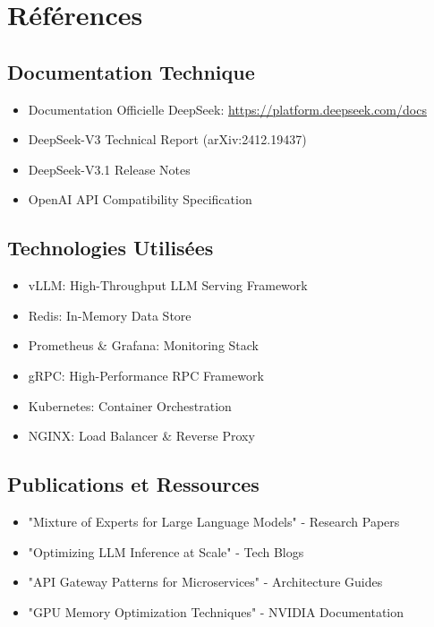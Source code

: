 \documentclass[12pt,a4paper]{article}
\begin{document}
\newpage
\section{Références}

\subsection{Documentation Technique}

\begin{itemize}[leftmargin=2cm]
    \item Documentation Officielle DeepSeek: \url{https://platform.deepseek.com/docs}
    \item DeepSeek-V3 Technical Report (arXiv:2412.19437)
    \item DeepSeek-V3.1 Release Notes
    \item OpenAI API Compatibility Specification
\end{itemize}

\subsection{Technologies Utilisées}

\begin{itemize}[leftmargin=2cm]
    \item vLLM: High-Throughput LLM Serving Framework
    \item Redis: In-Memory Data Store
    \item Prometheus \& Grafana: Monitoring Stack
    \item gRPC: High-Performance RPC Framework
    \item Kubernetes: Container Orchestration
    \item NGINX: Load Balancer \& Reverse Proxy
\end{itemize}

\subsection{Publications et Ressources}

\begin{itemize}[leftmargin=2cm]
    \item "Mixture of Experts for Large Language Models" - Research Papers
    \item "Optimizing LLM Inference at Scale" - Tech Blogs
    \item "API Gateway Patterns for Microservices" - Architecture Guides
    \item "GPU Memory Optimization Techniques" - NVIDIA Documentation
\end{itemize}
\end{document}
